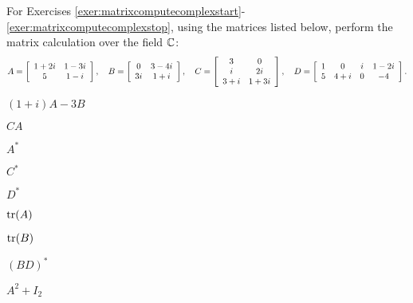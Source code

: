 \noindent For Exercises \ref{exer:matrixcomputecomplexstart}-\ref{exer:matrixcomputecomplexstop}, using the matrices listed below, perform the matrix calculation over the field $\C$:
\[A = \mtx{cc}{1+2i & 1-3i \\ 5 & 1-i },\quad B = \mtx{cc}{0 & 3-4i \\ 3i & 1+i}, \quad C = \mtx{cc}{3&0\\i&2i\\3+i&1+3i},\quad D=\mtx{cccc}{1& 0 & i & 1-2i \\ 5  & 4+i & 0 & -4}.\]
\begin{enumerate}[!HW!, label=$\spadesuit$ \arabic*., ref=\arabic*]
\begin{multicols}{5}
\item\label{exer:matrixcomputecomplexstart} $(1+i)A-3B$\\
\item $CA$
\item $A^*$
\item $C^*$
\item $D^*$
\end{multicols}
\begin{multicols}{4}
\item $\tr(A)$
\item $\tr(B)$
\item $(BD)^*$
\item\label{exer:matrixcomputecomplexstop} $A^2+I_2$
\end{multicols}
\end{enumerate}

